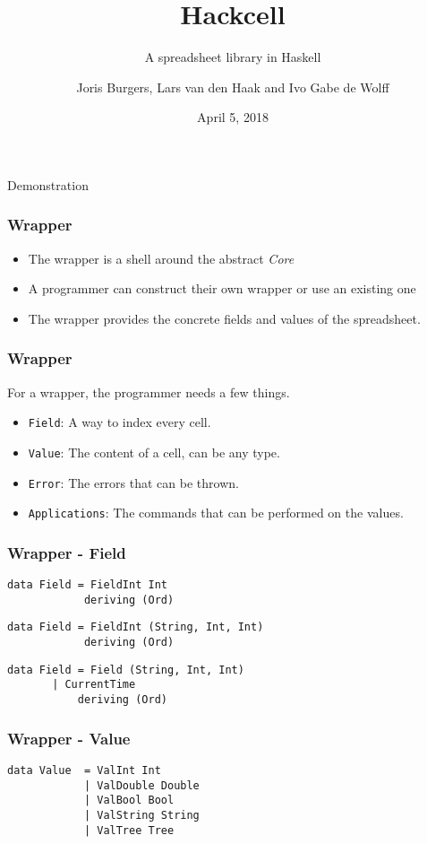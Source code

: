 \documentclass{beamer}
\title{Hackcell}
\subtitle{A spreadsheet library in Haskell}
\author{Joris Burgers, Lars van den Haak and Ivo Gabe de Wolff}
\date{April 5, 2018}
\begin{document}
	\frame{\titlepage}
  \begin{frame}
	\begin{center}
		\huge{Demonstration}
	\end{center}
  \end{frame}

  \begin{frame}
  		\frametitle{Wrapper}
		\begin{itemize}  		
  			\item The wrapper is a shell around the abstract \textit{Core}
  			\item A programmer can construct their own wrapper or use an existing one
  			\item The wrapper provides the concrete fields and values of the spreadsheet.
  		\end{itemize}
  \end{frame}
  \begin{frame}
  		\frametitle{Wrapper}
  		For a wrapper, the programmer needs a few things.
  		\begin{itemize}
  			\item \texttt{Field}: A way to index every cell.
  			\item \texttt{Value}: The content of a cell, can be any type.
  			\item \texttt{Error}: The errors that can be thrown.
  			\item \texttt{Applications}: The commands that can be performed on the values.
  		\end{itemize}
  \end{frame}
  \begin{frame}[fragile]
  		\frametitle{Wrapper - Field}
  		\begin{verbatim}
data Field = FieldInt Int
            deriving (Ord)
  		\end{verbatim}
  		\pause
		\begin{verbatim}
data Field = FieldInt (String, Int, Int)
            deriving (Ord)
  		\end{verbatim}  		
  		\pause
  		\begin{verbatim}
data Field = Field (String, Int, Int)
	   | CurrentTime
           deriving (Ord)
        \end{verbatim} 
  \end{frame}
\begin{frame}[fragile]
  		\frametitle{Wrapper - Value}
  		\begin{verbatim}
data Value  = ValInt Int
            | ValDouble Double
            | ValBool Bool
            | ValString String
            | ValTree Tree
  		\end{verbatim}
  \end{frame}
\end{document}
